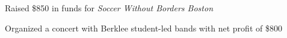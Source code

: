 \documentclass[10pt]{article}
\begin{document}
\begin{FlushLeft}
  
  \begin{itemize}{
      
    \item Raised \$850 in funds for \textit{Soccer Without Borders Boston}
    }
  \end{itemize}
  
  \begin{itemize}{
    \item Organized a concert with Berklee student-led bands with net profit of \$800
    }
  \end{itemize}
  

\end{FlushLeft}
\end{document}
